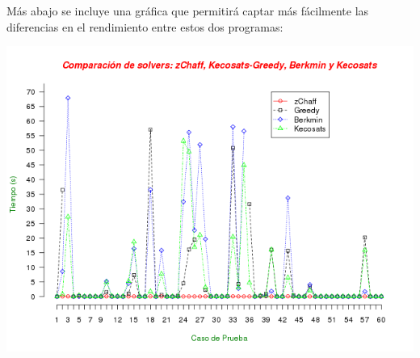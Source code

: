\documentclass[12pt,lettersize,oneside]{article}
\begin{document}
%


Más abajo se incluye una gráfica que permitirá captar más fácilmente las
diferencias en el rendimiento entre estos dos programas:
\begin{center}
\includegraphics[scale=0.62]{tiempos_sudokuIII.png}
\end{center}

\end{document}
